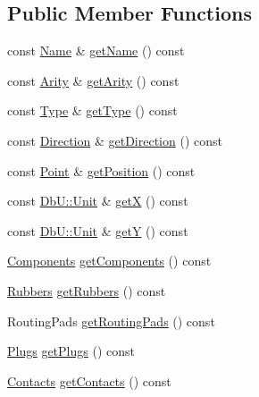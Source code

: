 \subsection*{Public Member Functions}
\begin{DoxyCompactItemize}
\item 
const \hyperlink{classHurricane_1_1Name}{Name} \& \hyperlink{classHurricane_1_1Net_afdea21658591675525b288fcacccde77}{get\-Name} () const 
\item 
const \hyperlink{classHurricane_1_1Net_a3a242d929e0c733f90f3f69be8cc427b}{Arity} \& \hyperlink{classHurricane_1_1Net_a81719535491a8c9e50c96ad185eabcba}{get\-Arity} () const 
\item 
const \hyperlink{classHurricane_1_1Net_1_1Type}{Type} \& \hyperlink{classHurricane_1_1Net_a3c4b7797fb10571585ebf891063a8398}{get\-Type} () const 
\item 
const \hyperlink{classHurricane_1_1Net_1_1Direction}{Direction} \& \hyperlink{classHurricane_1_1Net_ad075d861764b6e2d3cbcebf94e184a97}{get\-Direction} () const 
\item 
const \hyperlink{classHurricane_1_1Point}{Point} \& \hyperlink{classHurricane_1_1Net_a42772f8b1bf8073044fbbf0cf705aa62}{get\-Position} () const 
\item 
const \hyperlink{group__DbUGroup_ga4fbfa3e8c89347af76c9628ea06c4146}{Db\-U\-::\-Unit} \& \hyperlink{classHurricane_1_1Net_a232572eba91478515bab9cc0a497ce96}{get\-X} () const 
\item 
const \hyperlink{group__DbUGroup_ga4fbfa3e8c89347af76c9628ea06c4146}{Db\-U\-::\-Unit} \& \hyperlink{classHurricane_1_1Net_a071f6bdd32c0b993780df86952c798f5}{get\-Y} () const 
\item 
\hyperlink{namespaceHurricane_a7d26d99aeb5dd6d70d51bd35d2473e72}{Components} \hyperlink{classHurricane_1_1Net_a47c0a2dff87f932b6c27222b1b2d3e11}{get\-Components} () const 
\item 
\hyperlink{namespaceHurricane_af8923abd57508cc44931a00d61b564ad}{Rubbers} \hyperlink{classHurricane_1_1Net_a39f89ecd9215a234a8fb65fe9285b1d8}{get\-Rubbers} () const 
\item 
Routing\-Pads \hyperlink{classHurricane_1_1Net_a294b2cd267d55a9f3ea27f974ef57145}{get\-Routing\-Pads} () const 
\item 
\hyperlink{namespaceHurricane_ac8335d2057483ee7a935c15a9460c64f}{Plugs} \hyperlink{classHurricane_1_1Net_a2c8340816860d069b95214b35a58cceb}{get\-Plugs} () const 
\item 
\hyperlink{namespaceHurricane_a1e6a8ab09f688509bd727b3fee02d0d2}{Contacts} \hyperlink{classHurricane_1_1Net_a330a1b2341eaf9ebbcd4b7ea1234f039}{get\-Contacts} () const 

\end{DoxyCompactItemize}

